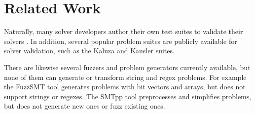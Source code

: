 \section{Related Work}

    Naturally, many solver developers author their own test suites to validate their solvers \cite{cvc4-tests} \cite{z3str3-tests} \cite{z3str2-tests}. In addition, several popular problem suites are publicly available for solver validation, such as the Kaluza \cite{kaluza} and Kausler \cite{kausler} suites.

    There are likewise several fuzzers and problem generators currently available, but none of them can generate or transform string and regex problems. For example the FuzzSMT\cite{fuzzsmt} tool generates \smt{} problems with bit vectors and arrays, but does not support strings or regexes. The SMTpp\cite{smtpp} tool preprocesses and simplifies problems, but does not generate new ones or fuzz existing ones.

